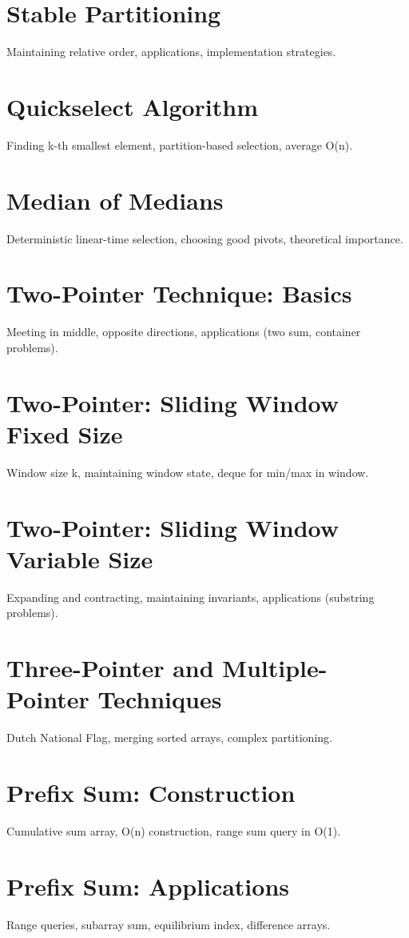 \chapter{Stable Partitioning}
Maintaining relative order, applications, implementation strategies.

\chapter{Quickselect Algorithm}
Finding k-th smallest element, partition-based selection, average O(n).

\chapter{Median of Medians}
Deterministic linear-time selection, choosing good pivots, theoretical importance.

\chapter{Two-Pointer Technique: Basics}
Meeting in middle, opposite directions, applications (two sum, container problems).

\chapter{Two-Pointer: Sliding Window Fixed Size}
Window size k, maintaining window state, deque for min/max in window.

\chapter{Two-Pointer: Sliding Window Variable Size}
Expanding and contracting, maintaining invariants, applications (substring problems).

\chapter{Three-Pointer and Multiple-Pointer Techniques}
Dutch National Flag, merging sorted arrays, complex partitioning.

\chapter{Prefix Sum: Construction}
Cumulative sum array, O(n) construction, range sum query in O(1).

\chapter{Prefix Sum: Applications}
Range queries, subarray sum, equilibrium index, difference arrays.

